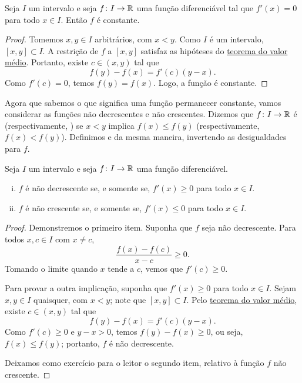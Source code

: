\begin{prop} \label{prop:derzeroconst}
Seja $I$ um intervalo e
seja $f \colon I \to {\mathbb{R}}$ uma função diferenciável tal que $f'(x) = 0$
para todo $x \in I$.
Então $f$ é constante.
\end{prop}

\begin{proof}
Tomemos $x,y \in I$ arbitrários, com $x < y$.
Como $I$ é um intervalo, $[x,y] \subset I$.
A restrição de $f$ a $[x,y]$ satisfaz as hipóteses
do \hyperref[thm:mvt]{teorema do valor médio}.
Portanto, existe $c \in (x,y)$ tal que
\begin{equation*}
f(y)-f(x) = f'(c)(y-x).
\end{equation*}
Como $f'(c) = 0$, temos $f(y) = f(x)$. Logo,
a função é constante.
\end{proof}

Agora que sabemos o que significa uma função permanecer constante, vamos
considerar as funções não decrescentes e não crescentes.
Dizemos que $f \colon I \to {\mathbb{R}}$ é \emph{}
(respectivamente, \emph{}) se
$x < y$ implica $f(x) \leq f(y)$ (respectivamente, $f(x) < f(y)$).
Definimos
\emph{} e
\emph{} da mesma maneira, invertendo as
desigualdades para $f$.

\begin{prop} \label{incdecdiffprop}
Seja $I$ um intervalo e
seja $f \colon I \to {\mathbb{R}}$ uma função diferenciável.
\begin{enumerate}[(i)]
\item $f$ é não decrescente se, e somente se, $f'(x) \geq 0$ para todo $x \in I$.
\item $f$ é não crescente se, e somente se, $f'(x) \leq 0$ para todo $x \in I$.
\end{enumerate}
\end{prop}

\begin{proof}
Demonstremos o primeiro item. Suponha que $f$ seja não decrescente.
Para todos $x,c \in I$ com $x \neq c$,
\begin{equation*}
\frac{f(x)-f(c)}{x-c} \geq 0 .
\end{equation*}
Tomando o limite quando $x$ tende a $c$, vemos que $f'(c) \geq 0$.

Para provar a outra implicação, suponha que $f'(x) \geq 0$ para todo $x \in I$.
Sejam $x, y \in I$ quaisquer, com $x < y$; note que $[x,y] \subset I$.
Pelo \hyperref[thm:mvt]{teorema do valor médio}, existe $c \in (x,y)$ tal que
\begin{equation*}
f(y)-f(x) = f'(c)(y-x) .
\end{equation*}
Como $f'(c) \geq 0$ e $y-x > 0$, temos $f(y) - f(x) \geq 0$, ou seja,
$f(x) \leq f(y)$; portanto,
$f$ é não decrescente.

Deixamos como exercício para o leitor o segundo item, relativo à função $f$
não crescente.
\end{proof}

